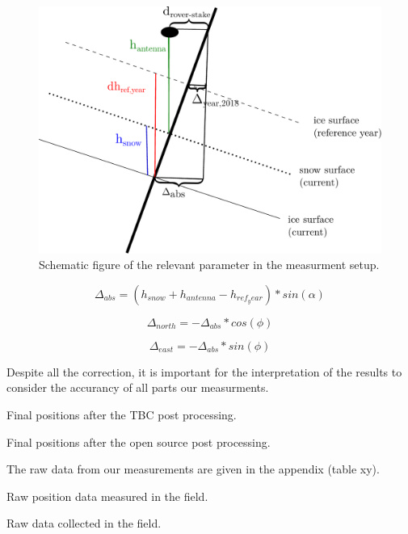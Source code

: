 \begin{figure}
\centering
\includegraphics[width=\linewidth]{./figs/pictures/schematic_setup.pdf}
\caption{Schematic figure of the relevant parameter in the measurment setup.}
\end{figure}


\begin{equation}
	\Delta_{abs} = (h_{snow} + h_{antenna} - h_{ref_year}) * sin(\alpha)
\end{equation}

\begin{equation}
	\Delta_{north} = - \Delta_{abs} * cos(\phi)
\end{equation}

\begin{equation}
	\Delta_{east} = - \Delta_{abs} * sin(\phi)
\end{equation}

Despite all the correction, it is important for the interpretation of the results to consider the accurancy of all parts our measurments.

\begin{table}[h]
\caption{Final positions after the TBC post processing.}
\centering 

\label{GPS:tab:tbc_tab}
\end{table}

\begin{table}[h]
\caption{Final positions after the open source post processing.}
\centering

\label{GPS:tab:os_tab}
\end{table}

The raw data from our measurements are given in the appendix (table xy). 

\begin{table}[h]
\caption{Raw position data measured in the field.}
\centering

\label{GPS:tab:fb_pos_tab}
\end{table}

\begin{table}[h]
\caption{Raw data collected in the field.}
\centering

\label{GPS:tab:fb_other_tab}
\end{table}




